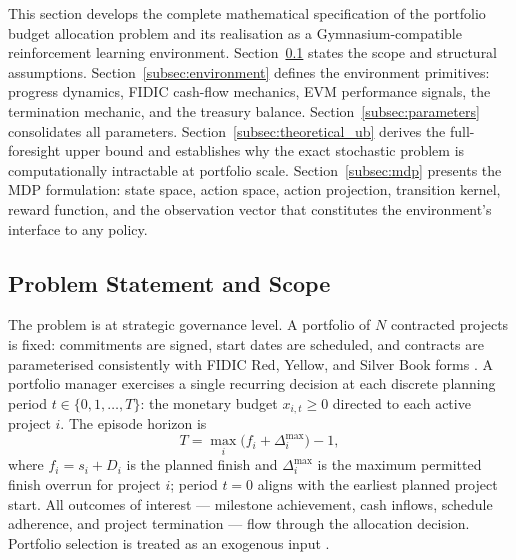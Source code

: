 
This section develops the complete mathematical specification of the
portfolio budget allocation problem and its realisation as a
Gymnasium-compatible reinforcement learning environment.
Section~\ref{subsec:problem_statement} states the scope and structural
assumptions. Section~\ref{subsec:environment} defines the environment
primitives: progress dynamics, FIDIC cash-flow mechanics, EVM
performance signals, the termination mechanic, and the treasury
balance. Section~\ref{subsec:parameters} consolidates all parameters.
Section~\ref{subsec:theoretical_ub} derives the full-foresight upper
bound and establishes why the exact stochastic problem is
computationally intractable at portfolio scale.
Section~\ref{subsec:mdp} presents the MDP formulation: state space,
action space, action projection, transition kernel, reward function,
and the observation vector that constitutes the environment's
interface to any policy.

\subsection{Problem Statement and Scope}
\label{subsec:problem_statement}



The problem is at strategic governance level. A portfolio of $N$ contracted
projects is fixed: commitments are signed, start dates are scheduled,
and contracts are parameterised consistently with FIDIC Red, Yellow,
and Silver Book forms \citep{FIDIC2017}. A portfolio manager exercises
a single recurring decision at each discrete planning period
$t \in \{0, 1, \ldots, T\}$: the monetary budget $x_{i,t} \geq 0$
directed to each active project $i$. The episode horizon is
\begin{equation}
  T = \max_{i} \bigl(f_i + \Delta^{\max}_i\bigr) - 1,
  \label{eq:horizon}
\end{equation}
where $f_i = s_i + D_i$ is the planned finish and $\Delta^{\max}_i$
is the maximum permitted finish overrun for project $i$; period $t=0$
aligns with the earliest planned project start. All outcomes of
interest --- milestone achievement, cash inflows, schedule adherence,
and project termination --- flow through the allocation decision.
Portfolio selection is treated as an exogenous input
\citep{Archer1999}.

